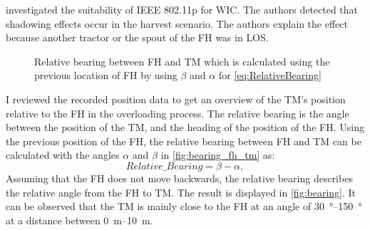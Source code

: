 \textcite{klingler_agriculture_2018} investigated the suitability of IEEE 802.11p for \ac{WIC}.
The authors detected that shadowing effects occur in the harvest scenario.
The authors explain the effect because another tractor or the spout of the \ac{FH} was in \ac{LOS}.
\begin{figure}%
	\centering
	\caption{Relative bearing between \ac{FH} and \ac{TM} which is calculated using the previous location of \ac{FH} by using $\beta$ and $\alpha$ for \autoref{eq:RelativeBearing}}%
	\label{fig:bearing_fh_tm}%
\end{figure}
I reviewed the recorded position data to get an overview of the \ac{TM}'s position relative to the \ac{FH} in the overloading process. The relative bearing is the angle between the position of the \ac{TM}, and the heading of the position of the \ac{FH}. Using the previous position of the \ac{FH}, the relative bearing between \ac{FH} and \ac{TM} can be calculated with the angles $\alpha$ and $\beta$ in \autoref{fig:bearing_fh_tm} as:
\begin{equation}\label{eq:RelativeBearing}
	Relative\_Bearing = \beta - \alpha	,
\end{equation}
Assuming that the \ac{FH} does not move backwards, the relative bearing describes the relative angle from the
\ac{FH} to \ac{TM}. The result is displayed in \autoref{fig:bearing}.
It can be observed that the \ac{TM} is mainly close to the \ac{FH} at an angle of \SIrange{30}{150}{\degree} at
a distance between \SIrange{0}{10}{\metre}.

